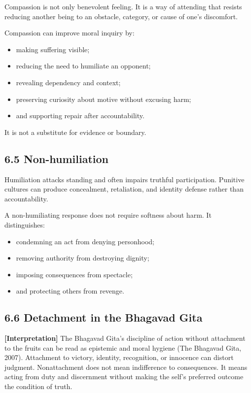 \documentclass[
  11pt,
]{article}
\providecommand{\tightlist}{%
  \setlength{\itemsep}{0pt}\setlength{\parskip}{0pt}}
\begin{document}
Compassion is not only benevolent feeling. It is a way of attending that
resists reducing another being to an obstacle, category, or cause of
one's discomfort.

Compassion can improve moral inquiry by:

\begin{itemize}
\tightlist
\item
  making suffering visible;
\item
  reducing the need to humiliate an opponent;
\item
  revealing dependency and context;
\item
  preserving curiosity about motive without excusing harm;
\item
  and supporting repair after accountability.
\end{itemize}

It is not a substitute for evidence or boundary.

\subsection{6.5 Non-humiliation}\label{non-humiliation}

Humiliation attacks standing and often impairs truthful participation.
Punitive cultures can produce concealment, retaliation, and identity
defense rather than accountability.

A non-humiliating response does not require softness about harm. It
distinguishes:

\begin{itemize}
\tightlist
\item
  condemning an act from denying personhood;
\item
  removing authority from destroying dignity;
\item
  imposing consequences from spectacle;
\item
  and protecting others from revenge.
\end{itemize}

\subsection{6.6 Detachment in the Bhagavad
Gita}\label{detachment-in-the-bhagavad-gita}

\textbf{{[}Interpretation{]}} The Bhagavad Gita's discipline of action
without attachment to the fruits can be read as epistemic and moral
hygiene (The Bhagavad Gita, 2007). Attachment to victory, identity,
recognition, or innocence can distort judgment. Nonattachment does not
mean indifference to consequences. It means acting from duty and
discernment without making the self's preferred outcome the condition of
truth.
\end{document}
